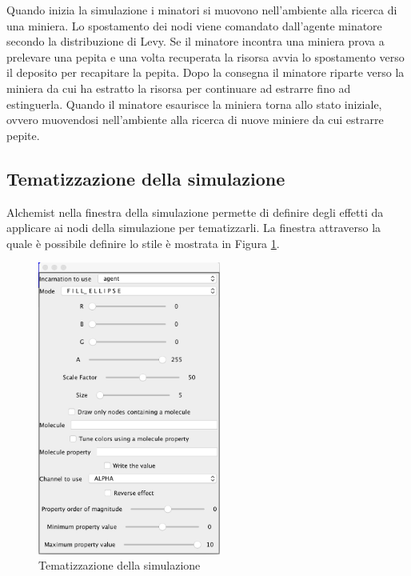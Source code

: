 Quando inizia la simulazione i minatori si muovono nell'ambiente alla ricerca di una miniera. Lo spostamento dei nodi viene comandato dall'agente minatore secondo la distribuzione di Levy.
Se il minatore incontra una miniera prova a prelevare una pepita e una volta recuperata la risorsa avvia lo spostamento verso il deposito per recapitare la pepita. Dopo la consegna il minatore riparte verso la miniera da cui ha estratto la risorsa per continuare ad estrarre fino ad estinguerla.
Quando il minatore esaurisce la miniera torna allo stato iniziale, ovvero muovendosi nell'ambiente alla ricerca di nuove miniere da cui estrarre pepite.


\subsection{Tematizzazione della simulazione}
Alchemist nella finestra della simulazione permette di definire degli effetti da applicare ai nodi della simulazione per tematizzarli. La finestra attraverso la quale è possibile definire lo stile è mostrata in Figura \ref{fig:tematizzazioneSimulazione}.

\begin{figure}[h] %
\begin{center} %
\includegraphics[width=6cm]{images/tematizzazioneSimulazione.png} %
\caption[Tematizzazione della simulazione]{Tematizzazione della simulazione} \label{fig:tematizzazioneSimulazione}
\end{center}
\end{figure} 

